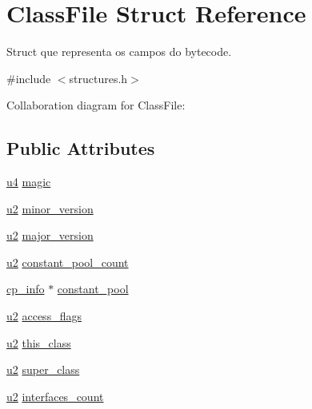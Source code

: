 \hypertarget{structClassFile}{}\section{Class\+File Struct Reference}
\label{structClassFile}


Struct que representa os campos do bytecode.  




{\ttfamily \#include $<$structures.\+h$>$}



Collaboration diagram for Class\+File\+:
\subsection*{Public Attributes}
\begin{DoxyCompactItemize}
\item 
\hyperlink{structures_8h_ae391a1d79bb0c8cbc283f0283e3c098b}{u4} \hyperlink{structClassFile_a09085e9db513dae2f46da6e0a26c1b59}{magic}
\item 
\hyperlink{structures_8h_a55ef8d87fd202b8417704c089899c5b9}{u2} \hyperlink{structClassFile_af0db7b0ea01cb9cea2cee177ca81df09}{minor\+\_\+version}
\item 
\hyperlink{structures_8h_a55ef8d87fd202b8417704c089899c5b9}{u2} \hyperlink{structClassFile_abede9cb937e65072517d0ee6e26e2757}{major\+\_\+version}
\item 
\hyperlink{structures_8h_a55ef8d87fd202b8417704c089899c5b9}{u2} \hyperlink{structClassFile_ac8fdf5cccfd632da4fdb21ae63fffa7a}{constant\+\_\+pool\+\_\+count}
\item 
\hyperlink{structcp__info}{cp\+\_\+info} $\ast$ \hyperlink{structClassFile_a2309d843091aad79aed04ce92470a434}{constant\+\_\+pool}
\item 
\hyperlink{structures_8h_a55ef8d87fd202b8417704c089899c5b9}{u2} \hyperlink{structClassFile_ae88db578147f7ee0d6fc1aeacb341854}{access\+\_\+flags}
\item 
\hyperlink{structures_8h_a55ef8d87fd202b8417704c089899c5b9}{u2} \hyperlink{structClassFile_a2d33db0a560a71b94bc572dd1e4ec03a}{this\+\_\+class}
\item 
\hyperlink{structures_8h_a55ef8d87fd202b8417704c089899c5b9}{u2} \hyperlink{structClassFile_a5f6c11c0ccb02fd992b5c102725253ec}{super\+\_\+class}
\item 
\hyperlink{structures_8h_a55ef8d87fd202b8417704c089899c5b9}{u2} \hyperlink{structClassFile_a337fcb7da33d1b64631441115c7de305}{interfaces\+\_\+count}

\end{DoxyCompactItemize}
